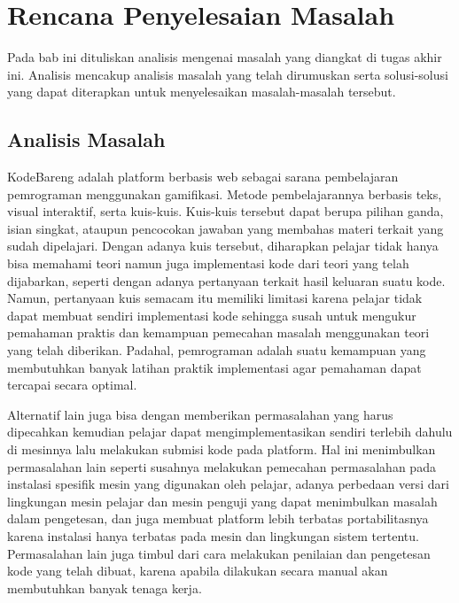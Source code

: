 \chapter{Rencana Penyelesaian Masalah}

Pada bab ini dituliskan analisis mengenai masalah yang diangkat di tugas akhir ini. Analisis mencakup analisis masalah yang telah dirumuskan serta solusi-solusi yang dapat diterapkan untuk menyelesaikan masalah-masalah tersebut.

\section{Analisis Masalah}
KodeBareng adalah platform berbasis web sebagai sarana pembelajaran pemrograman menggunakan gamifikasi. Metode pembelajarannya berbasis teks, visual interaktif, serta kuis-kuis. Kuis-kuis tersebut dapat berupa pilihan ganda, isian singkat, ataupun pencocokan jawaban yang membahas materi terkait yang sudah dipelajari. Dengan adanya kuis tersebut, diharapkan pelajar tidak hanya bisa memahami teori namun juga implementasi kode dari teori yang telah dijabarkan, seperti dengan adanya pertanyaan terkait hasil keluaran suatu kode. Namun, pertanyaan kuis semacam itu memiliki limitasi karena pelajar tidak dapat membuat sendiri implementasi kode sehingga susah untuk mengukur pemahaman praktis dan kemampuan pemecahan masalah menggunakan teori yang telah diberikan. Padahal, pemrograman adalah suatu kemampuan yang membutuhkan banyak latihan praktik implementasi agar pemahaman dapat tercapai secara optimal.

Alternatif lain juga bisa dengan memberikan permasalahan yang harus dipecahkan kemudian pelajar dapat mengimplementasikan sendiri terlebih dahulu di mesinnya lalu melakukan submisi kode pada platform. Hal ini menimbulkan permasalahan lain seperti susahnya melakukan pemecahan permasalahan pada instalasi spesifik mesin yang digunakan oleh pelajar, adanya perbedaan versi dari lingkungan mesin pelajar dan mesin penguji yang dapat menimbulkan masalah dalam pengetesan, dan juga membuat platform lebih terbatas portabilitasnya karena instalasi hanya terbatas pada mesin dan lingkungan sistem tertentu. Permasalahan lain juga timbul dari cara melakukan penilaian dan pengetesan kode yang telah dibuat, karena apabila dilakukan secara manual akan membutuhkan banyak tenaga kerja.


